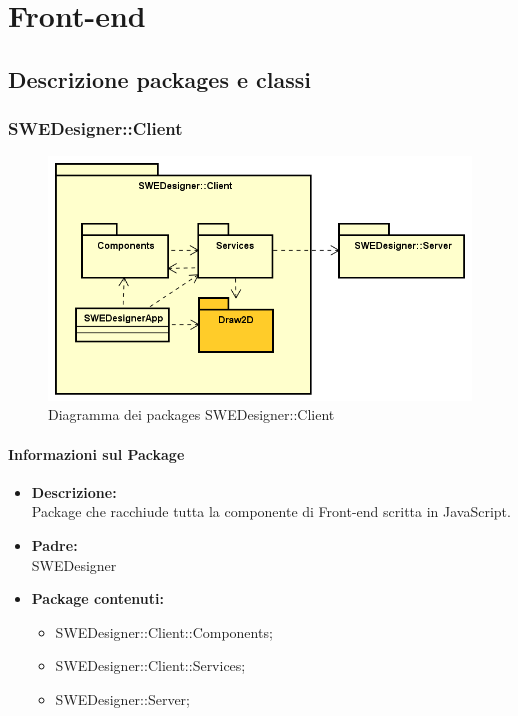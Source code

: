 \section{Front-end}

	\subsection{Descrizione packages e classi}
	
	\subsubsection{SWEDesigner::Client}
		 \begin{figure}[h!]
		\centering
		\includegraphics[scale=0.4]{Disegnetti/Front-End.png}
		\caption{Diagramma dei packages SWEDesigner::Client}
 		\end{figure}
		\paragraph{Informazioni sul Package}
		\begin{itemize}				
			\item \textbf{Descrizione: }\\
			Package che racchiude tutta la componente di Front-end scritta in JavaScript.
			\item \textbf{Padre: }\\ SWEDesigner
			\item \textbf{Package contenuti: }
			\begin{itemize}		
				\item SWEDesigner::Client::Components;
				\item SWEDesigner::Client::Services;
				\item SWEDesigner::Server;
			\end{itemize}
		\end{itemize}
		
